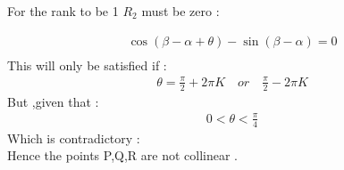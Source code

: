 \documentclass[journal]{IEEEtran}
\begin{document}
For the rank to be 1 $R_2$ must be zero :

\begin{align}
   \cos(\beta - \alpha + \theta) - \sin(\beta - \alpha) = 0\\
\end{align}
This will only be satisfied if  :
\begin{align}
    \theta = \frac{\pi}{2} + 2\pi K \quad or  \quad \frac{\pi}{2} - 2\pi K
\end{align}
But ,given that :
\begin{align}
    0 < \theta < \frac{\pi}{4}
\end{align}
Which is contradictory :\\
Hence the points P,Q,R are not collinear .
\end{document}
